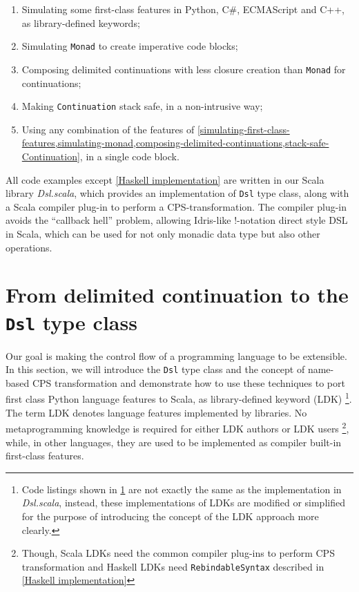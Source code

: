 \begin{enumerate}
  \item Simulating some first-class features in Python, C\#, ECMAScript and C++, as library-defined keywords;
  \label{simulating-first-class-features}

  \item Simulating \lstinline{Monad} to create imperative code blocks;
  \label{simulating-monad}

  \item Composing delimited continuations with less closure creation than \lstinline{Monad} for continuations;
  \label{composing-delimited-continuations}

  \item Making \lstinline{Continuation} stack safe, in a non-intrusive way; %
  \label{stack-safe-Continuation}

  \item Using any combination of the features of \cref{simulating-first-class-features,simulating-monad,composing-delimited-continuations,stack-safe-Continuation}, in a single code block.
\end{enumerate}

All code examples except \cref{Haskell implementation} are written in our Scala library \textit{Dsl.scala}, which provides an implementation of \lstinline{Dsl} type class, along with a Scala compiler plug-in to perform a CPS-transformation. The compiler plug-in avoids the ``callback hell'' problem, allowing Idris-like !-notation \cite{brady2013idris} direct style DSL in Scala, which can be used for not only monadic data type but also other operations.

\section{From delimited continuation to the \lstinline{Dsl} type class}\label{Basic concepts}

Our goal is making the control flow of a programming language to be extensible. In this section, we will introduce the \lstinline{Dsl} type class and the concept of name-based CPS transformation and demonstrate how to use these techniques to port first class Python language features to Scala, as library-defined keyword (LDK) \footnote{Code listings shown in \cref{Basic concepts} are not exactly the same as the implementation in \textit{Dsl.scala}, instead, these implementations of LDKs are modified or simplified for the purpose of introducing the concept of the LDK approach more clearly.}. The term LDK denotes language features implemented by libraries. No metaprogramming knowledge is required for either LDK authors or LDK users \footnote{ Though, Scala LDKs need the common compiler plug-ins to perform CPS transformation and Haskell LDKs need \lstinline{RebindableSyntax} described in \cref{Haskell implementation}}, while, in other languages, they are used to be implemented as compiler built-in first-class features.

